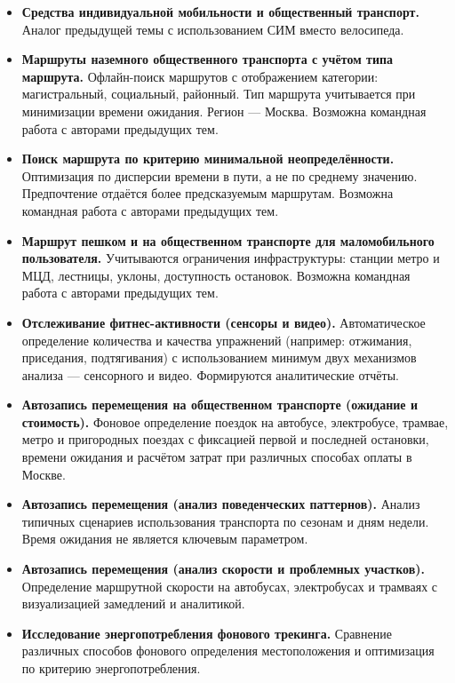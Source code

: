 \documentclass[a4paper,12pt]{article}
\begin{document}
\begin{itemize}
\item \textbf{Средства индивидуальной мобильности и общественный транспорт.}
Аналог предыдущей темы с использованием СИМ вместо велосипеда.

\item \textbf{Маршруты наземного общественного транспорта с учётом типа маршрута.}
Офлайн-поиск маршрутов с отображением категории: магистральный, социальный, районный. Тип маршрута учитывается при минимизации времени ожидания. Регион — Москва.
Возможна командная работа с авторами предыдущих тем.

\item \textbf{Поиск маршрута по критерию минимальной неопределённости.}
Оптимизация по дисперсии времени в пути, а не по среднему значению. Предпочтение отдаётся более предсказуемым маршрутам.
Возможна командная работа с авторами предыдущих тем.

\item \textbf{Маршрут пешком и на общественном транспорте для маломобильного пользователя.}
Учитываются ограничения инфраструктуры: станции метро и МЦД, лестницы, уклоны, доступность остановок.
Возможна командная работа с авторами предыдущих тем.

\item \textbf{Отслеживание фитнес-активности (сенсоры и видео).}
Автоматическое определение количества и качества упражнений (например: отжимания, приседания, подтягивания) с использованием минимум двух механизмов анализа — сенсорного и видео. Формируются аналитические отчёты.

\item \textbf{Автозапись перемещения на общественном транспорте (ожидание и стоимость).}
Фоновое определение поездок на автобусе, электробусе, трамвае, метро и пригородных поездах с фиксацией первой и последней остановки, времени ожидания и расчётом затрат при различных способах оплаты в Москве.

\item \textbf{Автозапись перемещения (анализ поведенческих паттернов).}
Анализ типичных сценариев использования транспорта по сезонам и дням недели. Время ожидания не является ключевым параметром.

\item \textbf{Автозапись перемещения (анализ скорости и проблемных участков).}
Определение маршрутной скорости на автобусах, электробусах и трамваях с визуализацией замедлений и аналитикой.

\item \textbf{Исследование энергопотребления фонового трекинга.}
Сравнение различных способов фонового определения местоположения и оптимизация по критерию энергопотребления.


\end{itemize}
\end{document}
